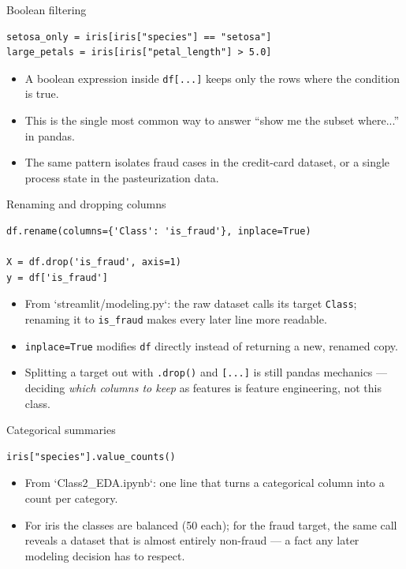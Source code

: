 \begin{frame}[fragile]{Boolean filtering}
\begin{lstlisting}[style=coursepython]
setosa_only = iris[iris["species"] == "setosa"]
large_petals = iris[iris["petal_length"] > 5.0]
\end{lstlisting}
\begin{itemize}
\item A boolean expression inside \texttt{df[...]} keeps only the rows where the condition is true.
\item This is the single most common way to answer ``show me the subset where...'' in pandas.
\item The same pattern isolates fraud cases in the credit-card dataset, or a single process state in the pasteurization data.
\end{itemize}
\coursefooter
\end{frame}

\begin{frame}[fragile]{Renaming and dropping columns}
\begin{lstlisting}[style=coursepython]
df.rename(columns={'Class': 'is_fraud'}, inplace=True)

X = df.drop('is_fraud', axis=1)
y = df['is_fraud']
\end{lstlisting}
\begin{itemize}
\item From `streamlit/modeling.py`: the raw dataset calls its target \texttt{Class}; renaming it to \texttt{is\_fraud} makes every later line more readable.
\item \texttt{inplace=True} modifies \texttt{df} directly instead of returning a new, renamed copy.
\item Splitting a target out with \texttt{.drop()} and \texttt{[...]} is still pandas mechanics --- deciding \emph{which columns to keep} as features is feature engineering, not this class.
\end{itemize}
\coursefooter
\end{frame}

\begin{frame}[fragile]{Categorical summaries}
\begin{lstlisting}[style=coursepython]
iris["species"].value_counts()
\end{lstlisting}
\begin{itemize}
\item From `Class2\_EDA.ipynb`: one line that turns a categorical column into a count per category.
\item For iris the classes are balanced (50 each); for the fraud target, the same call reveals a dataset that is almost entirely non-fraud --- a fact any later modeling decision has to respect.
\end{itemize}
\coursefooter
\end{frame}

